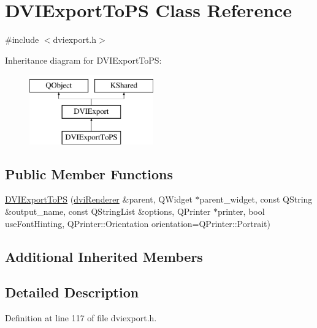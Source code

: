\hypertarget{classDVIExportToPS}{\section{D\+V\+I\+Export\+To\+P\+S Class Reference}
\label{classDVIExportToPS}
}


{\ttfamily \#include $<$dviexport.\+h$>$}

Inheritance diagram for D\+V\+I\+Export\+To\+P\+S\+:\begin{figure}[H]
\begin{center}
\leavevmode
\includegraphics[height=3.000000cm]{classDVIExportToPS}
\end{center}
\end{figure}
\subsection*{Public Member Functions}
\begin{DoxyCompactItemize}
\item 
\hyperlink{classDVIExportToPS_acd020f645187eca0256e4d009110d734}{D\+V\+I\+Export\+To\+P\+S} (\hyperlink{classdviRenderer}{dvi\+Renderer} \&parent, Q\+Widget $\ast$parent\+\_\+widget, const Q\+String \&output\+\_\+name, const Q\+String\+List \&options, Q\+Printer $\ast$printer, bool use\+Font\+Hinting, Q\+Printer\+::\+Orientation orientation=Q\+Printer\+::\+Portrait)
\end{DoxyCompactItemize}
\subsection*{Additional Inherited Members}


\subsection{Detailed Description}


Definition at line 117 of file dviexport.\+h.



